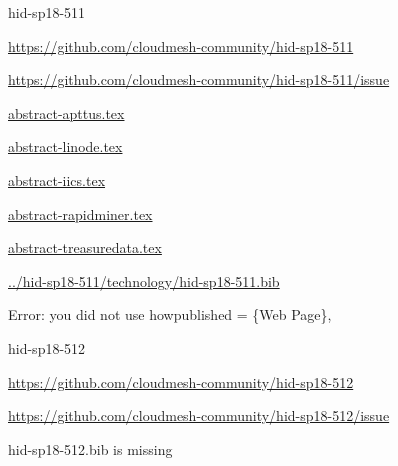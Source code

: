 \begin{IU}

hid-sp18-511

\url{https://github.com/cloudmesh-community/hid-sp18-511}

\url{https://github.com/cloudmesh-community/hid-sp18-511/issue}

\href{https://github.com/cloudmesh-community/hid-sp18-511/blob/master//technology/abstract-apttus.tex}{abstract-apttus.tex}

\href{https://github.com/cloudmesh-community/hid-sp18-511/blob/master//technology/abstract-linode.tex}{abstract-linode.tex}

\href{https://github.com/cloudmesh-community/hid-sp18-511/blob/master//technology/abstract-iics.tex}{abstract-iics.tex}

\href{https://github.com/cloudmesh-community/hid-sp18-511/blob/master//technology/abstract-rapidminer.tex}{abstract-rapidminer.tex}

\href{https://github.com/cloudmesh-community/hid-sp18-511/blob/master//technology/abstract-treasuredata.tex}{abstract-treasuredata.tex}

\href{https://github.com/cloudmesh-community/hid-sp18-511/blob/master//technology/hid-sp18-511.bib}{../hid-sp18-511/technology/hid-sp18-511.bib}

Error: you did not use howpublished = \{Web Page\},

\end{IU}


\begin{IU}

hid-sp18-512

\url{https://github.com/cloudmesh-community/hid-sp18-512}

\url{https://github.com/cloudmesh-community/hid-sp18-512/issue}

hid-sp18-512.bib is missing

\end{IU}


